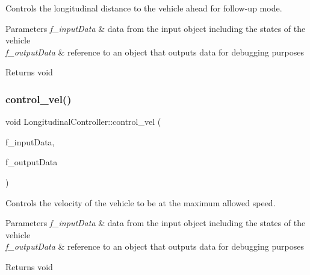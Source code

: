 Controls the longitudinal distance to the vehicle ahead for follow-\/up mode. 


\begin{DoxyParams}{Parameters}
{\em f\+\_\+input\+Data} & data from the input object including the states of the vehicle \\
\hline
{\em f\+\_\+output\+Data} & reference to an object that outputs data for debugging purposes \\
\hline
\end{DoxyParams}
\begin{DoxyReturn}{Returns}
void 
\end{DoxyReturn}
\mbox{\label{class_longitudinal_controller_a929cebc70c1503b3d124692aaa46cb2e}} 
\subsubsection{\texorpdfstring{control\_vel()}{control\_vel()}\hspace{0.1cm}{\footnotesize\ttfamily [1/2]}}
{\footnotesize\ttfamily void Longitudinal\+Controller\+::control\+\_\+vel (\begin{DoxyParamCaption}\item[{const \mbox{\hyperlink{struct_input_data}{Input\+Data}}}]{f\+\_\+input\+Data,  }\item[{\mbox{\hyperlink{struct_output_data}{Output\+Data}} \&}]{f\+\_\+output\+Data }\end{DoxyParamCaption})}



Controls the velocity of the vehicle to be at the maximum allowed speed. 


\begin{DoxyParams}{Parameters}
{\em f\+\_\+input\+Data} & data from the input object including the states of the vehicle \\
\hline
{\em f\+\_\+output\+Data} & reference to an object that outputs data for debugging purposes \\
\hline
\end{DoxyParams}
\begin{DoxyReturn}{Returns}
void 
\end{DoxyReturn}
\mbox{\label{class_longitudinal_controller_ab397e2217ad705edb2bf4b06d31c8b4e}} 
